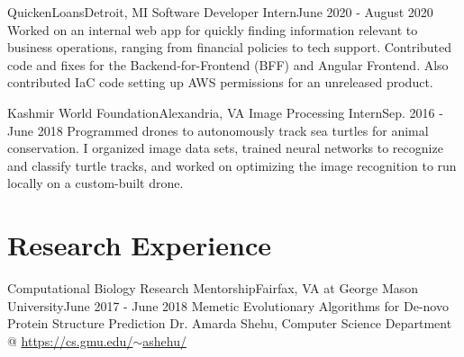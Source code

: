 \documentclass[11pt]{article}
\begin{document}
    \resumeSubheading
      {QuickenLoans}{Detroit, MI}
      {Software Developer Intern}{June 2020 - August 2020}
      \resumeItemListStart
          {Worked on an internal web app for quickly finding information relevant to business operations, ranging from financial policies to tech support. Contributed code and fixes for the Backend-for-Frontend (BFF) and Angular Frontend. Also contributed IaC code setting up AWS permissions for an unreleased product.}
      \resumeItemListEnd

    \resumeSubheading
      {Kashmir World Foundation}{Alexandria, VA}
      {Image Processing Intern}{Sep. 2016 - June 2018}
      \resumeItemListStart
          {Programmed drones to autonomously track sea turtles for animal conservation. I organized image data sets, trained neural networks to recognize and classify turtle tracks, and worked on optimizing the image recognition to run locally on a custom-built drone.}
      \resumeItemListEnd

  \resumeSubHeadingListEnd
  
\section{Research Experience}
  \resumeSubHeadingListStart
    \resumeSubheading
      {Computational Biology Research Mentorship}{Fairfax, VA}
      {at George Mason University}{June 2017 - June 2018}
      \resumeItemListStart
          {Memetic Evolutionary Algorithms for De-novo Protein Structure Prediction}
          {Dr. Amarda Shehu, Computer Science Department @ \href{https://cs.gmu.edu/~ashehu/}{https://cs.gmu.edu/$\sim$ashehu/}}
      \resumeItemListEnd

  \resumeSubHeadingListEnd

\end{document}

